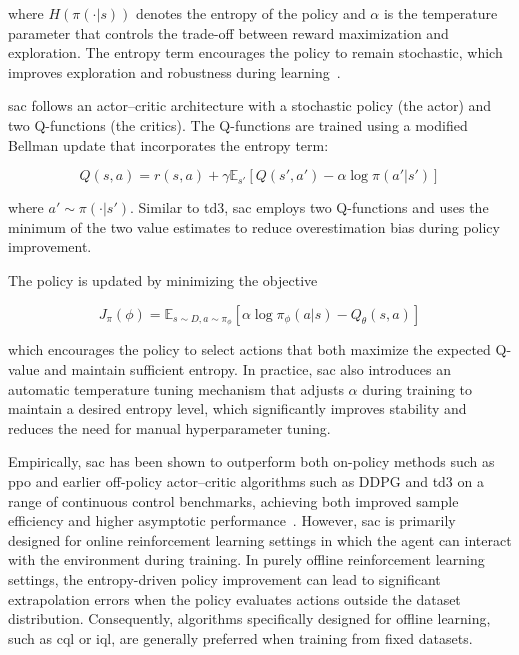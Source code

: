 where $H(\pi(\cdot|s))$ denotes the entropy of the policy and $\alpha$ is the temperature parameter that controls the trade-off between reward maximization and exploration.
The entropy term encourages the policy to remain stochastic, which improves exploration and robustness during learning~\cite{haarnoja2019}.

\gls{sac} follows an actor–critic architecture with a stochastic policy (the actor) and two Q-functions (the critics).
The Q-functions are trained using a modified Bellman update that incorporates the entropy term:

\begin{equation} \label{eq:sac_q}
Q(s,a) = r(s,a) + \gamma \mathbb{E}_{s'} 
\left[
Q(s',a') - \alpha \log \pi(a'|s')
\right]
\end{equation}

where $a' \sim \pi(\cdot|s')$.
Similar to \gls{td3}, \gls{sac} employs two Q-functions and uses the minimum of the two value estimates to reduce overestimation bias during policy improvement.

The policy is updated by minimizing the objective

\begin{equation} \label{eq:sac_objective2}
J_\pi(\phi) =
\mathbb{E}_{s\sim D, a\sim \pi_\phi}
\left[
\alpha \log \pi_\phi(a|s) - Q_\theta(s,a)
\right]
\end{equation}

which encourages the policy to select actions that both maximize the expected Q-value and maintain sufficient entropy.
In practice, \gls{sac} also introduces an automatic temperature tuning mechanism that adjusts $\alpha$ during training to maintain a desired entropy level, which significantly improves stability and reduces the need for manual hyperparameter tuning.

Empirically, \gls{sac} has been shown to outperform both on-policy methods such as \gls{ppo} and earlier off-policy actor–critic algorithms such as DDPG and \gls{td3} on a range of continuous control benchmarks, achieving both improved sample efficiency and higher asymptotic performance~\cite{haarnoja2019}.
However, \gls{sac} is primarily designed for online reinforcement learning settings in which the agent can interact with the environment during training.
In purely offline reinforcement learning settings, the entropy-driven policy improvement can lead to significant extrapolation errors when the policy evaluates actions outside the dataset distribution.
Consequently, algorithms specifically designed for offline learning, such as \gls{cql} or \gls{iql}, are generally preferred when training from fixed datasets.

